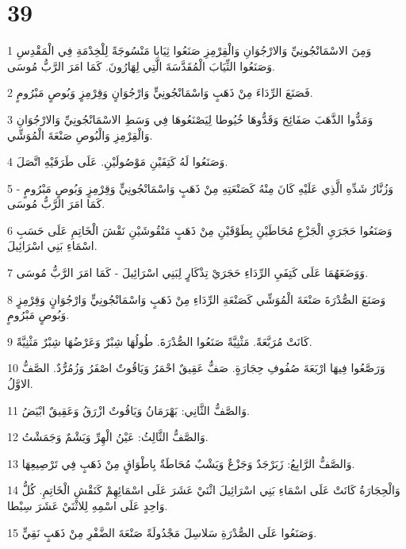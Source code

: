 \chapter{39}

\par 1 وَمِنَ الاسْمَانْجُونِيِّ وَالارْجُوَانِ وَالْقِرْمِزِ صَنَعُوا ثِيَابا مَنْسُوجَةً لِلْخِدْمَةِ فِي الْمَقْدِسِ وَصَنَعُوا الثِّيَابَ الْمُقَدَّسَةَ الَّتِي لِهَارُونَ. كَمَا امَرَ الرَّبُّ مُوسَى.
\par 2 فَصَنَعَ الرِّدَاءَ مِنْ ذَهَبٍ وَاسْمَانْجُونِيٍّ وَارْجُوَانٍ وَقِرْمِزٍ وَبُوصٍ مَبْرُومٍ.
\par 3 وَمَدُّوا الذَّهَبَ صَفَائِحَ وَقَدُّوهَا خُيُوطا لِيَصْنَعُوهَا فِي وَسَطِ الاسْمَانْجُونِيِّ وَالارْجُوَانِ وَالْقِرْمِزِ وَالْبُوصِ صَنْعَةَ الْمُوَشِّي.
\par 4 وَصَنَعُوا لَهُ كَتِفَيْنِ مَوْصُولَيْنِ. عَلَى طَرَفَيْهِ اتَّصَلَ.
\par 5 وَزُنَّارُ شَدِّهِ الَّذِي عَلَيْهِ كَانَ مِنْهُ كَصَنْعَتِهِ مِنْ ذَهَبٍ وَاسْمَانْجُونِيٍّ وَقِرْمِزٍ وَبُوصٍ مَبْرُومٍ - كَمَا امَرَ الرَّبُّ مُوسَى.
\par 6 وَصَنَعُوا حَجَرَيِ الْجَزْعِ مُحَاطَيْنِ بِطَوْقَيْنِ مِنْ ذَهَبٍ مَنْقُوشَيْنِ نَقْشَ الْخَاتِمِ عَلَى حَسَبِ اسْمَاءِ بَنِي اسْرَائِيلَ.
\par 7 وَوَضَعَهُمَا عَلَى كَتِفَيِ الرِّدَاءِ حَجَرَيْ تِذْكَارٍ لِبَنِي اسْرَائِيلَ - كَمَا امَرَ الرَّبُّ مُوسَى.
\par 8 وَصَنَعَ الصُّدْرَةَ صَنْعَةَ الْمُوَشِّي كَصَنْعَةِ الرِّدَاءِ مِنْ ذَهَبٍ وَاسْمَانْجُونِيٍّ وَارْجُوَانٍ وَقِرْمِزٍ وَبُوصٍ مَبْرُومٍ.
\par 9 كَانَتْ مُرَبَّعَةً. مَثْنِيَّةً صَنَعُوا الصُّدْرَةَ. طُولُهَا شِبْرٌ وَعَرْضُهَا شِبْرٌ مَثْنِيَّةً.
\par 10 وَرَصَّعُوا فِيهَا ارْبَعَةَ صُفُوفِ حِجَارَةٍ. صَفٌّ عَقِيقٌ احْمَرُ وَيَاقُوتٌ اصْفَرُ وَزُمُرُّدٌ. الصَّفُّ الاوَّلُ.
\par 11 وَالصَّفُّ الثَّانِي: بَهْرَمَانُ وَيَاقُوتٌ ازْرَقُ وَعَقِيقٌ ابْيَضُ.
\par 12 وَالصَّفُّ الثَّالِثُ: عَيْنُ الْهِرِّ وَيَشْمٌ وَجَمَشْتُ.
\par 13 وَالصَّفُّ الرَّابِعُ: زَبَرْجَدٌ وَجَزْعٌ وَيَشْبٌ مُحَاطَةٌ بِاطْوَاقٍ مِنْ ذَهَبٍ فِي تَرْصِيعِهَا.
\par 14 وَالْحِجَارَةُ كَانَتْ عَلَى اسْمَاءِ بَنِي اسْرَائِيلَ اثْنَيْ عَشَرَ عَلَى اسْمَائِهِمْ كَنَقْشِ الْخَاتِمِ. كُلُّ وَاحِدٍ عَلَى اسْمِهِ لِلاثْنَيْ عَشَرَ سِبْطا.
\par 15 وَصَنَعُوا عَلَى الصُّدْرَةِ سَلاسِلَ مَجْدُولَةً صَنْعَةَ الضَّفْرِ مِنْ ذَهَبٍ نَقِيٍّ.
